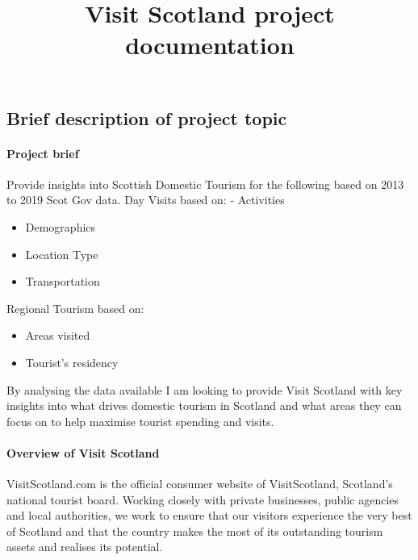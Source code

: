 \documentclass[
]{article}
\title{Visit Scotland project documentation}
\author{}
\date{\vspace{-2.5em}}
\begin{document}
\maketitle

{
\setcounter{tocdepth}{2}
\tableofcontents
}
\hypertarget{brief-description-of-project-topic}{%
\subsection{Brief description of project
topic}\label{brief-description-of-project-topic}}

\hypertarget{project-brief}{%
\paragraph{Project brief}\label{project-brief}}

Provide insights into Scottish Domestic Tourism for the following based
on 2013 to 2019 Scot Gov data. Day Visits based on: - Activities

\begin{itemize}
\item
  Demographics
\item
  Location Type
\item
  Transportation
\end{itemize}

Regional Tourism based on:

\begin{itemize}
\item
  Areas visited
\item
  Tourist's residency
\end{itemize}

By analysing the data available I am looking to provide Visit Scotland
with key insights into what drives domestic tourism in Scotland and what
areas they can focus on to help maximise tourist spending and visits.

\hypertarget{overview-of-visit-scotland}{%
\paragraph{Overview of Visit
Scotland}\label{overview-of-visit-scotland}}

VisitScotland.com is the official consumer website of VisitScotland,
Scotland's national tourist board. Working closely with private
businesses, public agencies and local authorities, we work to ensure
that our visitors experience the very best of Scotland and that the
country makes the most of its outstanding tourism assets and realises
its potential.
\end{document}
